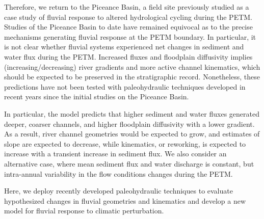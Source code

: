 \documentclass[draft]{compact_proposal}\usepackage[]{graphicx}\usepackage[]{color}
\begin{document}


Therefore, we return to the Piceance Basin, a field site previously studied as a case study of fluvial response to altered hydrological cycling during the PETM.
Studies of the Piceance Basin to date  have remained equivocal as to the precise mechanisms generating fluvial response at the PETM boundary.
In particular, it is not clear whether fluvial systems experienced net changes in sediment and water flux during the PETM.
Increased fluxes and floodplain diffusivity implies (increasing/decreasing) river gradients and more active channel kinematics, which should be expected to be preserved in the stratigraphic record.
Nonetheless, these predictions have not been tested with paleohydraulic techniques developed in recent years since the initial studies on the Piceance Basin.

In particular, the \cnote[BZF] model predicts that higher sediment and water fluxes generated deeper, coarser channels, and higher floodplain diffusivity with a lower gradient.
As a result, river channel geometries would be expected to grow, and estimates of slope are expected to decrease, while kinematics, or reworking, is expected to increase with a transient increase in sediment flux.
We also consider an alternative case, where mean sediment flux and water discharge is constant, but intra-annual variability in the flow conditions changes during the PETM.

Here, we deploy recently developed paleohydraulic techniques to evaluate hypothesized changes in fluvial geometries and kinematics and develop a new model for fluvial response to climatic perturbation.
\end{document}

